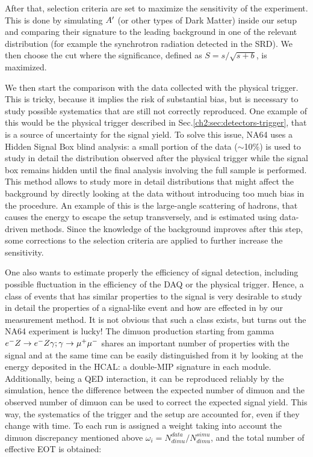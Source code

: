 After that, selection criteria are set to maximize the sensitivity of the experiment. This is done by simulating $A'$ (or other types of Dark Matter) inside our setup and comparing their signature to the leading background in one of the relevant distribution (for example the synchrotron radiation detected in the SRD). We then choose the cut where the significance, defined as $S = s/\sqrt{s+b}$, is maximized.

We then start the comparison with the data collected with the physical trigger. This is tricky, because it implies the risk of substantial bias, but is necessary to study possible systematics that are still not correctly reproduced. One example of this would be the physical trigger described in Sec.\ref{ch2:sec:detectors-trigger}, that is a source of uncertainty for the signal yield. To solve this issue, NA64 uses a Hidden Signal Box blind analysis\cite{blind-analysis}: a small portion of the data ($\sim$10\%) is used to study in detail the distribution observed after the physical trigger while the signal box remains hidden until the final analysis involving the full sample is performed. This method allows to study more in detail distributions that might affect the background by directly looking at the data without introducing too much bias in the procedure. An example of this is the large-angle scattering of hadrons, that causes the energy to escape the setup transversely, and is estimated using data-driven methods. Since the knowledge of the background improves after this step, some corrections to the selection criteria are applied to further increase the sensitivity.

One also wants to estimate properly the efficiency of signal detection, including possible fluctuation in the efficiency of the DAQ or the physical trigger. Hence, a class of events that has similar properties to the signal is very desirable to study in detail the properties of a signal-like event and how are effected in by our measurement method. It is not obvious that such a class exists, but turns out the NA64 experiment is lucky! The dimuon production starting from gamma $e^- Z \to e^- Z \gamma; \gamma \to \mu^+ \mu^-$ shares an important number of properties with the signal and at the same time can be easily distinguished from it by looking at the energy deposited in the HCAL: a double-MIP signature in each module. Additionally, being a QED interaction, it can be reproduced reliably by the simulation, hence the difference between the expected number of dimuon and the observed number of dimuon can be used to correct the expected signal yield. This way, the systematics of the trigger and the setup are accounted for, even if they change with time. To each run is assigned a weight taking into account the dimuon discrepancy mentioned above $\omega_i = N^{data}_{dimu}/N^{simu}_{dimu}$, and the total number of effective EOT is obtained:

